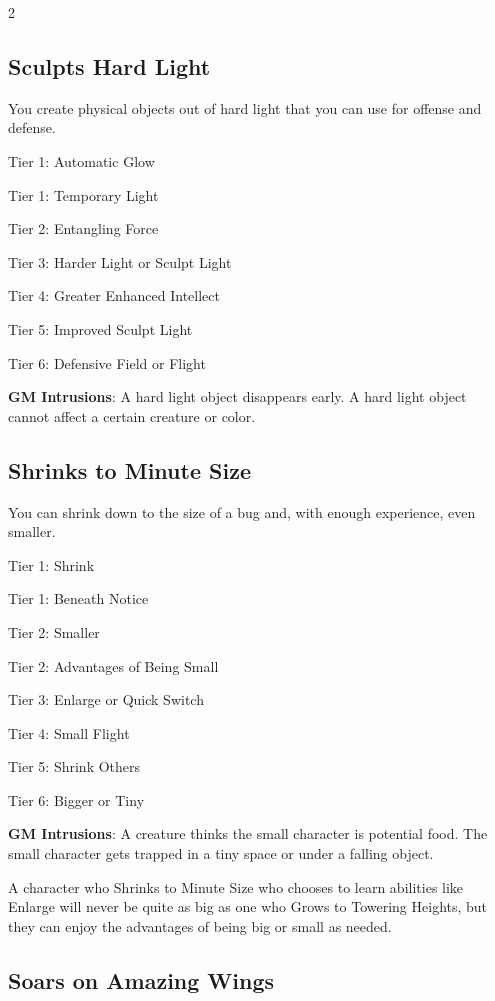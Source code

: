 \begin{multicols}{2}
\subsection{Sculpts Hard Light} 

You create physical objects out of hard light that you can use for offense and defense.

Tier 1: Automatic Glow

Tier 1: Temporary Light

Tier 2: Entangling Force 

Tier 3: Harder Light or Sculpt Light 

Tier 4: Greater Enhanced Intellect 

Tier 5: Improved Sculpt Light 

Tier 6: Defensive Field or Flight 

\textbf{GM Intrusions}: A hard light object disappears early. A hard light object cannot affect a certain creature or color.

\subsection{Shrinks to Minute Size} 

You can shrink down to the size of a bug and, with enough experience, even smaller. 

Tier 1: Shrink

Tier 1: Beneath Notice

Tier 2: Smaller

Tier 2: Advantages of Being Small

Tier 3: Enlarge or Quick Switch

Tier 4: Small Flight

Tier 5: Shrink Others

Tier 6: Bigger or Tiny

\textbf{GM Intrusions}: A creature thinks the small character is potential food. The small character gets trapped in a tiny space or under a falling object.

A character who Shrinks to Minute Size who chooses to learn abilities like Enlarge will never be quite as big as one who Grows to Towering Heights, but they can enjoy the advantages of being big or small as needed.

\subsection{Soars on Amazing Wings} 


\end{multicols}
